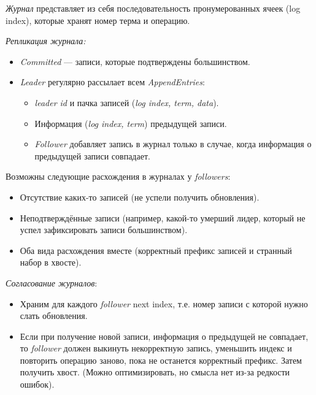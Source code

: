 \begin{definition}
    \textit{Журнал} представляет из себя последовательность пронумерованных
    ячеек (log index), которые хранят номер терма и операцию.
\end{definition}

\begin{algorithm} \textit{Репликация журнала:}
    \begin{itemize}
        \item \textit{Committed} --- записи, которые подтверждены большинством.
        \item \textit{Leader} регулярно рассылает всем \textit{AppendEntries}:
            \begin{itemize}
                \item \textit{leader id} и пачка записей (\textit{log index, term, data}).
                \item Информация (\textit{log index, term}) предыдущей записи.
                \item \textit{Follower} добавляет запись в журнал только в случае,
                    когда информация о предыдущей записи совпадает.
            \end{itemize}
    \end{itemize}
\end{algorithm}

\begin{remark}
    Возможны следующие расхождения в журналах у \textit{followers}:
    \begin{itemize}
        \item Отсутствие каких-то записей (не успели получить обновления).
        \item Неподтверждённые записи (например, какой-то умерший лидер,
            который не успел зафиксировать записи большинством).
        \item Оба вида расхождения вместе (корректный префикс записей и странный набор в хвосте).
    \end{itemize}
\end{remark}

\begin{algorithm} \textit{Согласование журналов}:
    \begin{itemize}
        \item Храним для каждого \textit{follower} next index, т.е. номер
            записи с которой нужно слать обновления.
        \item Если при получение новой записи, информация о предыдущей не совпадает,
            то \textit{follower} должен выкинуть некорректную запись, уменьшить индекс и
            повторить операцию заново, пока не останется корректный префикс. Затем получить
            хвост. (Можно оптимизировать, но смысла нет из-за редкости ошибок).
    \end{itemize}
\end{algorithm}

